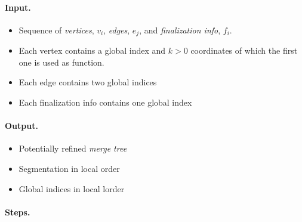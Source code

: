 \documentclass[]{article}
\begin{document}
\paragraph{Input.} 

\begin{itemize}
\item Sequence of {\it vertices}, $v_i$, {\it edges}, $e_j$, and {\it
    finalization info}, $f_i$.
\item Each vertex contains a global index and $k > 0$ coordinates of which the
  first one is used as function.
\item Each edge contains two global indices
\item Each finalization info contains one global index
\end{itemize}

\paragraph{Output.}

\begin{itemize}
\item Potentially refined {\it merge tree}
\item Segmentation in local order
\item Global indices in local lorder
\end{itemize}

\paragraph{Steps.}
\end{document}
